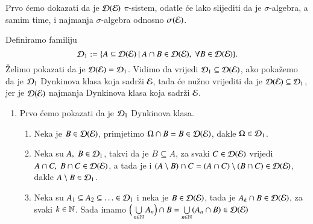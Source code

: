 \begin{rj}[\ref{zad:2.5}]
    Prvo \' cemo dokazati da je $\mathcal{D}({\mathcal{E}})$ $\pi$-sistem, odatle \' ce lako slijediti da je $\sigma$-algebra, a samim time, i najmanja $\sigma$-algebra odnosno $\sigma({\mathcal{E}})$.

    Definiramo familiju
    \begin{equation*}
        \mathcal{D}_1 := \{{A \subseteq \mathcal{D}({\mathcal{E}})} \: | \: {A \cap B \in \mathcal{D}({\mathcal{E}}), \; \forall B \in \mathcal{D}({\mathcal{E}})}\}.
    \end{equation*}
    \v Zelimo pokazati da je $\mathcal{D}({\mathcal{E}}) = \mathcal{D}_1$.
    Vidimo da vrijedi $\mathcal{D}_1 \subseteq \mathcal{D}({\mathcal{E}})$, ako poka\v zemo da je $\mathcal{D}_1$ Dynkinova klasa koja sadr\v zi $\mathcal{E}$, tada \' ce nu\v zno vrijediti da je $\mathcal{D}({\mathcal{E}}) \subseteq \mathcal{D}_1$, jer je $\mathcal{D}({\mathcal{E}})$ najmanja Dynkinova klasa koja sadr\v zi $\mathcal{E}$.
    
    \begin{enumerate}[label=(\arabic*)]
        \item \label{rj:2.5a}
        Prvo \' cemo pokazati da je $\mathcal{D}_1$ Dynkinova klasa.
        \begin{enumerate}[label=(\roman*)]
            \item Neka je $B \in \mathcal{D}({\mathcal{E}})$, primjetimo $\Omega \cap B = B \in \mathcal{D}({\mathcal{E}})$, dakle $\Omega \in \mathcal{D}_1$.
            \item Neka su $A, \;B \in \mathcal{D}_1$, takvi da je $B \subseteq A$, za svaki $C \in \mathcal{D}({\mathcal{E}})$ vrijedi $A \cap C, \; B \cap C \in \mathcal{D}({\mathcal{E}})$, a tada je i $(A \setminus B) \cap C = (A \cap C) \setminus (B \cap C) \in \mathcal{D}({\mathcal{E}})$, dakle $A \setminus B \in \mathcal{D}_1$.
            \item Neka su $A_1 \subseteq A_2 \subseteq \ldots \in \mathcal{D}_1$ i neka je $B \in \mathcal{D}({\mathcal{E}})$, tada je $A_k \cap B \in \mathcal{D}({\mathcal{E}})$, za svaki $k \in \mathbb{N}$.
            Sada imamo $\Big(\bigcup\limits_{n \in \mathbb{N}}^{} A_n \Big) \cap B = \bigcup\limits_{n \in \mathbb{N}}^{} (A_n \cap B) \in \mathcal{D}({\mathcal{E}})$
        \end{enumerate}


\end{enumerate}
\end{rj}
